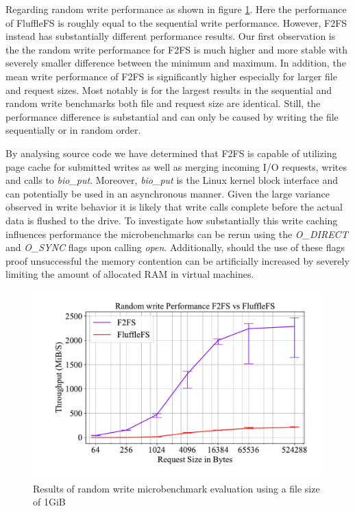 Regarding random write performance as shown in figure \ref{figure:writerandom}.
Here the performance of FluffleFS is roughly equal to the sequential write
performance. However, F2FS instead has substantially different performance
results. Our first observation is the the random write performance for F2FS is
much higher and more stable with severely smaller difference between the minimum
and maximum. In addition, the mean write performance of F2FS is significantly
higher especially for larger file and request sizes. Most notably is for the
largest results in the sequential and random write benchmarks both file and
request size are identical. Still, the performance difference is substantial and
can only be caused by writing the file sequentially or in random order.

By analysing source code we have determined that F2FS is capable of utilizing
page cache for submitted writes as well as merging incoming I/O requests, writes
and calls to \textit{bio\_put}. Moreover, \textit{bio\_put} is the Linux kernel
block interface and can potentially be used in an asynchronous manner. Given the
large variance observed in write behavior it is likely that write calls complete
before the actual data is flushed to the drive. To investigate how substantially
this write caching influences performance the microbenchmarks can be rerun
using the \textit{O\_DIRECT} and \textit{O\_SYNC} flags upon calling
\textit{open}. Additionally, should the use of these flags proof unsuccessful
the memory contention can be artificially increased by severely limiting the
amount of allocated RAM in virtual machines.

\begin{figure}[h]
    \centering
	\includegraphics[width=1\textwidth]{resources/images/results-random-write.pdf}
	\caption{Results of random write microbenchmark evaluation using a file size
        of 1GiB}
    \label{figure:writerandom}
\end{figure}


